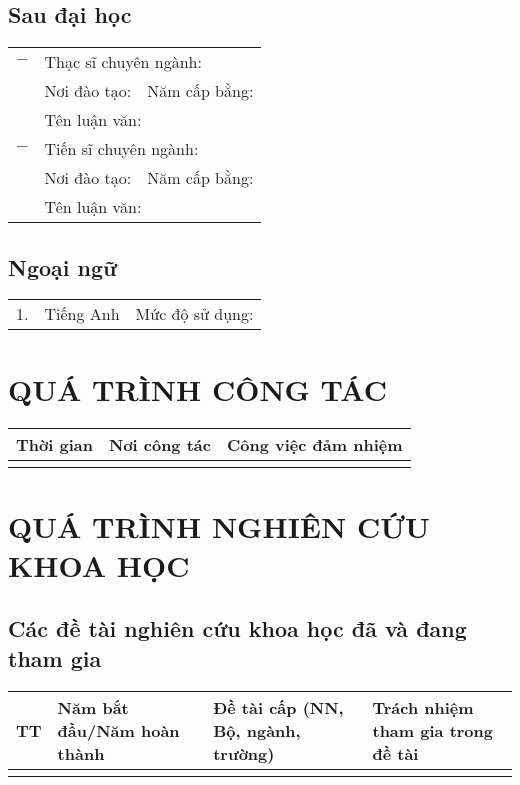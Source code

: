 \documentclass[a4paper, 11pt]{article}
\begin{document}
\subsection{Sau đại học}

\begin{tabularx}{\columnwidth}{p{0.1cm}p{12cm}X}
$-$ & \multicolumn{2}{l}{Thạc sĩ chuyên ngành: }\\
 & Nơi đào tạo:  & Năm cấp bằng: \\
 & \multicolumn{2}{l}{Tên luận văn: }\\
$-$ & \multicolumn{2}{l}{Tiến sĩ chuyên ngành: }\\
 & Nơi đào tạo: & Năm cấp bằng: \\
 & \multicolumn{2}{l}{Tên luận văn: }\\
\end{tabularx}

\subsection{Ngoại ngữ}

\begin{tabularx}{\columnwidth}{p{0.1cm}XX}
1. & Tiếng Anh & Mức độ sử dụng: \\
\end{tabularx}

\section{QUÁ TRÌNH CÔNG TÁC}

\begin{tabularx}{\columnwidth}{|X|X|X|}
\hline
Thời gian & Nơi công tác & Công việc đảm nhiệm \\
\hline
& & \\
\hline
\end{tabularx}

\section{QUÁ TRÌNH NGHIÊN CỨU KHOA HỌC}

\subsection{Các đề tài nghiên cứu khoa học đã và đang tham gia}

\begin{tabularx}{\columnwidth}{|p{0.5cm}|X|X|X|}
\hline
TT & Năm bắt đầu/Năm hoàn thành & Đề tài cấp (NN, Bộ, ngành, trường) & Trách nhiệm tham gia trong đề tài \\
\hline
& & & \\
\hline
\end{tabularx}
\end{document}

